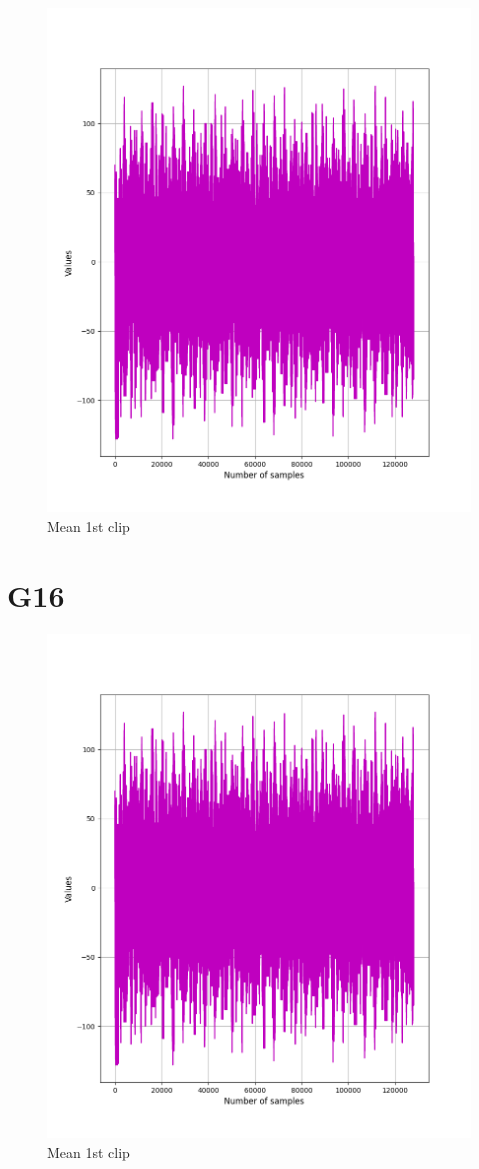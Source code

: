 \documentclass[hidelinks, 12pt, a4paper]{article}
\begin{document}
\begin{figure}[h!]
\centering
	\includegraphics[height=.4\textheight, width=\textwidth]{assets/session1/g10.png}
	\caption{Mean 1st clip} 
\end{figure}

\section{G16}

\begin{figure}[h!]
\centering
	\includegraphics[height=.4\textheight, width=\textwidth]{assets/session1/g10.png}
	\caption{Mean 1st clip} 
\end{figure}
\end{document}
